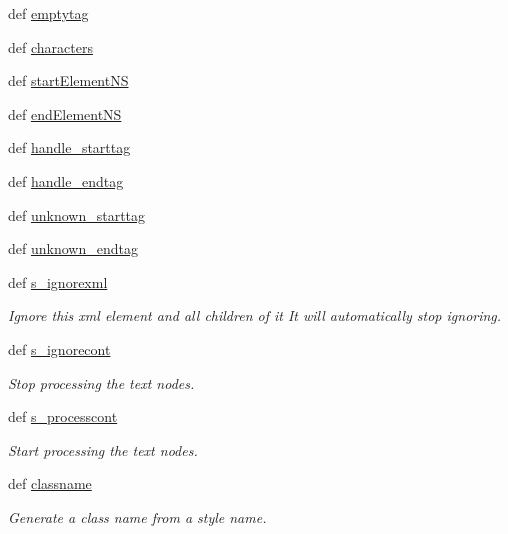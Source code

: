 \begin{DoxyCompactItemize}
def \hyperlink{classodf_1_1odf2xhtml_1_1ODF2XHTML_a9ee26dcf1feb3df0f12c4d8002d4e32c}{emptytag}
\item 
def \hyperlink{classodf_1_1odf2xhtml_1_1ODF2XHTML_a90dddefdc86ee815b6e082d197baf5a9}{characters}
\item 
def \hyperlink{classodf_1_1odf2xhtml_1_1ODF2XHTML_af195c0704a6b8cc099ec6f1b1166d30e}{start\+Element\+N\+S}
\item 
def \hyperlink{classodf_1_1odf2xhtml_1_1ODF2XHTML_aeb37ac2c1802fa9811626ff65d456e31}{end\+Element\+N\+S}
\item 
def \hyperlink{classodf_1_1odf2xhtml_1_1ODF2XHTML_a36bcd64cd1a12ee8fe7a9ad0f881e3d2}{handle\+\_\+starttag}
\item 
def \hyperlink{classodf_1_1odf2xhtml_1_1ODF2XHTML_a41cf2a9afe50a7b44a3ba228c3146bc3}{handle\+\_\+endtag}
\item 
def \hyperlink{classodf_1_1odf2xhtml_1_1ODF2XHTML_a1d97b9516606d6095871964ebb7d0be8}{unknown\+\_\+starttag}
\item 
def \hyperlink{classodf_1_1odf2xhtml_1_1ODF2XHTML_a4f93faa6c31639334b6abd86bb6506b6}{unknown\+\_\+endtag}
\item 
def \hyperlink{classodf_1_1odf2xhtml_1_1ODF2XHTML_a8bca7bd2ede86ab89e3d60b436180a4c}{s\+\_\+ignorexml}
\begin{DoxyCompactList}\small\item\em Ignore this xml element and all children of it It will automatically stop ignoring. \end{DoxyCompactList}\item 
def \hyperlink{classodf_1_1odf2xhtml_1_1ODF2XHTML_a2e5fa48b9126cb1fe757efded212043a}{s\+\_\+ignorecont}
\begin{DoxyCompactList}\small\item\em Stop processing the text nodes. \end{DoxyCompactList}\item 
def \hyperlink{classodf_1_1odf2xhtml_1_1ODF2XHTML_a478a6884118151771e6c92f691d70685}{s\+\_\+processcont}
\begin{DoxyCompactList}\small\item\em Start processing the text nodes. \end{DoxyCompactList}\item 
def \hyperlink{classodf_1_1odf2xhtml_1_1ODF2XHTML_af65e51ca4c0dff1364d8afbb41fe0baf}{classname}
\begin{DoxyCompactList}\small\item\em Generate a class name from a style name. \end{DoxyCompactList}\item 

\end{DoxyCompactItemize}
